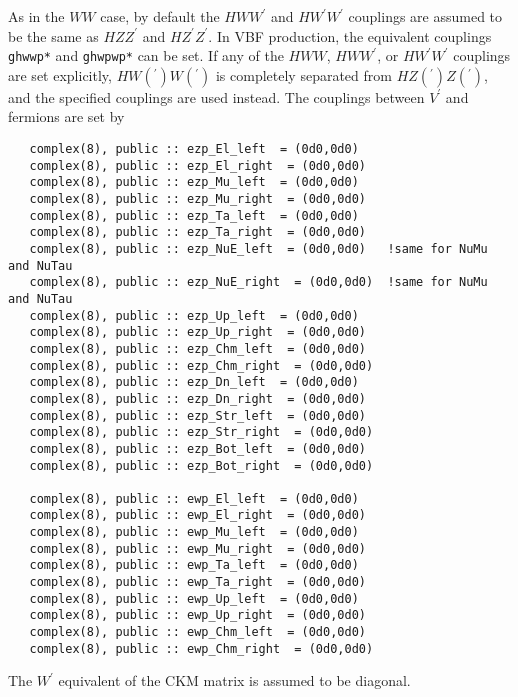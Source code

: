 \documentclass[aps,superscriptaddress,nofootinbib]{revtex4}
\begin{document}
As in the $WW$ case, by default the $HWW^\prime$ and $HW^\prime W^\prime$ couplings are assumed to be the same as $HZZ^\prime$ and $HZ^\prime Z^\prime$.  In VBF production, the equivalent couplings \verb|ghwwp*| and \verb|ghwpwp*| can be set.  If any of the $HWW$, $HWW^\prime$, or $HW^\prime W^\prime$ couplings are set explicitly, $HW({}^\prime)W(^{\prime})$ is completely separated from $HZ({}^\prime)Z(^{\prime})$, and the specified couplings are used instead.
The couplings between $V^\prime$ and fermions are set by
\begin{verbatim}
   complex(8), public :: ezp_El_left  = (0d0,0d0)
   complex(8), public :: ezp_El_right  = (0d0,0d0)
   complex(8), public :: ezp_Mu_left  = (0d0,0d0)
   complex(8), public :: ezp_Mu_right  = (0d0,0d0)
   complex(8), public :: ezp_Ta_left  = (0d0,0d0)
   complex(8), public :: ezp_Ta_right  = (0d0,0d0)
   complex(8), public :: ezp_NuE_left  = (0d0,0d0)   !same for NuMu and NuTau
   complex(8), public :: ezp_NuE_right  = (0d0,0d0)  !same for NuMu and NuTau
   complex(8), public :: ezp_Up_left  = (0d0,0d0)
   complex(8), public :: ezp_Up_right  = (0d0,0d0)
   complex(8), public :: ezp_Chm_left  = (0d0,0d0)
   complex(8), public :: ezp_Chm_right  = (0d0,0d0)
   complex(8), public :: ezp_Dn_left  = (0d0,0d0)
   complex(8), public :: ezp_Dn_right  = (0d0,0d0)
   complex(8), public :: ezp_Str_left  = (0d0,0d0)
   complex(8), public :: ezp_Str_right  = (0d0,0d0)
   complex(8), public :: ezp_Bot_left  = (0d0,0d0)
   complex(8), public :: ezp_Bot_right  = (0d0,0d0)

   complex(8), public :: ewp_El_left  = (0d0,0d0)
   complex(8), public :: ewp_El_right  = (0d0,0d0)
   complex(8), public :: ewp_Mu_left  = (0d0,0d0)
   complex(8), public :: ewp_Mu_right  = (0d0,0d0)
   complex(8), public :: ewp_Ta_left  = (0d0,0d0)
   complex(8), public :: ewp_Ta_right  = (0d0,0d0)
   complex(8), public :: ewp_Up_left  = (0d0,0d0)
   complex(8), public :: ewp_Up_right  = (0d0,0d0)
   complex(8), public :: ewp_Chm_left  = (0d0,0d0)
   complex(8), public :: ewp_Chm_right  = (0d0,0d0)
\end{verbatim}

The $W^\prime$ equivalent of the CKM matrix is assumed to be diagonal.
\end{document}
